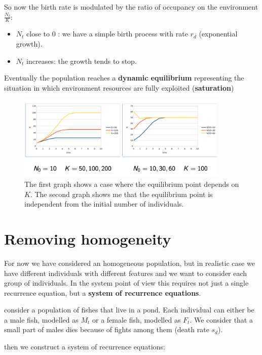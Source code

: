 So now the birth rate is modulated by the ratio of occupancy on the environment $\frac{N_{t}}{K}$:

\begin{itemize}

    \item $N_{t}$ close to 0 : we have a simple birth process with rate $r_{d}$ (exponential growth). 

    \item $N_{t}$ increases: the growth tends to stop.

\end{itemize}

Eventually the population reaches a \textbf{dynamic equilibrium} representing the situation in which environment resources are fully exploited (\textbf{saturation})

\begin{figure}[h]
    \centering
    \includegraphics[width=0.9\textwidth]{Images/02-Discrete Dynamical Systems/Non-linear .png}
    \caption{The first graph shows a case where the equilibrium point depends on $K$. The second graph shows me that the equilibrium point is independent from the initial number of individuals.} 
\end{figure}

\section{Removing homogeneity}
For now we have considered an homogeneous population, but in realistic case we have different individuals with different features and we want to consider each group of individuals. In the system point of view this requires not just a single recurrence equation, but a \textbf{system of recurrence equations}. 
\par consider a population of fishes that live in a pond. Each individual can either be a male fish, modelled as $M_t$ or a female fish, modelled as $F_t$. We consider that a small part of males dies because of fights among them (death rate $s_d$).
\par then we construct a system of recurrence equations:



